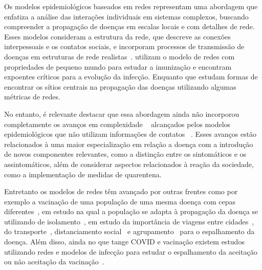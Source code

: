 Os modelos epidemiológicos baseados em redes representam uma abordagem que enfatiza a análise das interações individuais em sistemas complexos, buscando compreender a propagação de doenças em escalas locais e com detalhes de rede. Esses modelos consideram a estrutura da rede, que descreve as conexões interpessoais e os contatos sociais, e incorporam processos de transmissão de doenças em estruturas de rede realistas~\cite{Pei2023}.  utilizam o modelo de redes com propriedades de pequeno mundo para estudar a imunização e encontram expoentes críticos para a evolução da infecção. Enquanto que  estudam formas de encontrar os sítios centrais na propagação das doenças utilizando algumas métricas de redes.


No entanto, é relevante destacar que essa abordagem ainda não incorporou completamente os avanços em complexidade ~\cite{Eikenberry2020} alcançados pelos modelos epidemiológicos 
que não utilizam informações de contatos ~\cite{Pellis2015}. Esses avanços estão relacionados à uma maior especialização em relação a doença com a introdução de novos componentes relevantes, como a distinção entre os sintomáticos e os assintomáticos, além de considerar aspectos relacionados à reação da sociedade, como a implementação de medidas de quarentena.

Entretanto os modelos de redes têm avançado por outras frentes como por exemplo a vacinação de uma população de uma mesma doença com cepas diferentes~\cite{Li2023}, em estudo na qual a população se adapta à propagação da doença se utilizando de isolamento~\cite{Silva2023}, em estudo da importância de viagens entre cidades~\cite{Quiroga2023,DellaRossa2020}, do transporte~\cite{Scabini2021}, distanciamento social~\cite{Maheshwari2020} e agrupamento~\cite{Craig2020} para o espalhamento da doença. Além disso, ainda no que tange COVID e vacinação existem estudos utilizando redes e modelos de infecção para estudar o espalhamento da aceitação ou não aceitação da vacinação~\cite{n_vacina}.

